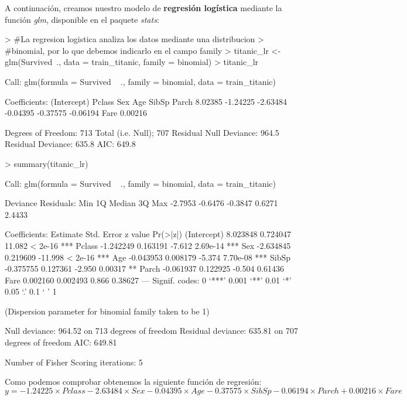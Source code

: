 \documentclass [a4paper] {article}
\begin{document}
A continuación, creamos nuestro modelo de \textbf{regresión logística} mediante la función \textit{glm}, disponible en el paquete \textit{stats}:
\begin{Schunk}
\begin{Sinput}
> #La regresion logistica analiza los datos mediante una distribucion
> #binomial, por lo que debemos indicarlo en el campo family
> titanic_lr <- glm(Survived~., data = train_titanic, family = binomial)
> titanic_lr
\end{Sinput}
\begin{Soutput}
Call:  glm(formula = Survived ~ ., family = binomial, data = train_titanic)

Coefficients:
(Intercept)       Pclass          Sex          Age        SibSp        Parch  
    8.02385     -1.24225     -2.63484     -0.04395     -0.37575     -0.06194  
       Fare  
    0.00216  

Degrees of Freedom: 713 Total (i.e. Null);  707 Residual
Null Deviance:	    964.5 
Residual Deviance: 635.8 	AIC: 649.8
\end{Soutput}
\begin{Sinput}
> summary(titanic_lr)
\end{Sinput}
\begin{Soutput}
Call:
glm(formula = Survived ~ ., family = binomial, data = train_titanic)

Deviance Residuals: 
    Min       1Q   Median       3Q      Max  
-2.7953  -0.6476  -0.3847   0.6271   2.4433  

Coefficients:
             Estimate Std. Error z value Pr(>|z|)    
(Intercept)  8.023848   0.724047  11.082  < 2e-16 ***
Pclass      -1.242249   0.163191  -7.612 2.69e-14 ***
Sex         -2.634845   0.219609 -11.998  < 2e-16 ***
Age         -0.043953   0.008179  -5.374 7.70e-08 ***
SibSp       -0.375755   0.127361  -2.950  0.00317 ** 
Parch       -0.061937   0.122925  -0.504  0.61436    
Fare         0.002160   0.002493   0.866  0.38627    
---
Signif. codes:  0 ‘***’ 0.001 ‘**’ 0.01 ‘*’ 0.05 ‘.’ 0.1 ‘ ’ 1

(Dispersion parameter for binomial family taken to be 1)

    Null deviance: 964.52  on 713  degrees of freedom
Residual deviance: 635.81  on 707  degrees of freedom
AIC: 649.81

Number of Fisher Scoring iterations: 5
\end{Soutput}
\end{Schunk}

Como podemos comprobar obtenemos la siguiente función de regresión:
\begin{equation*}
y = -1.24225 \times Pclass -2.63484 \times Sex -0.04395 \times Age -0.37575 \times SibSp -0.06194 \times Parch + 0.00216 \times Fare
\end{equation*}
\end{document}
